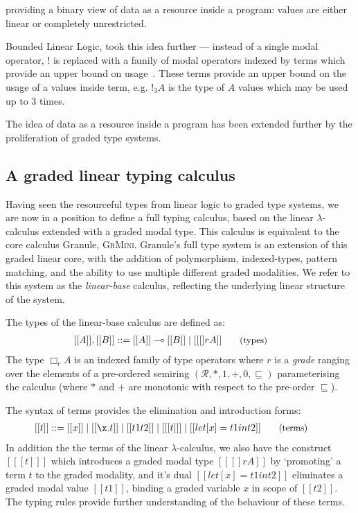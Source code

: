 providing a binary view of data as a
resource inside a program: values are either linear or completely unrestricted.

Bounded Linear Logic, took this idea further --- instead of a single modal
operator, $!$ is replaced with a family of modal operators indexed by terms
which provide an upper bound on usage~\cite{}. These terms provide an upper bound on
the usage of a values inside term, e.g. $!_{3}A$ is the type of $A$ values which
may be used up to 3 times.


The idea of data as a resource inside a program has been extended further by the
proliferation of graded type systems.


\subsection{A graded linear typing calculus}
\label{sec:linear-base}

Having seen the resourceful types from linear logic to graded type systems, we
are now in a position to define a full typing calculus, based on the linear
$\lambda$-calculus extended with a graded modal type. This calculus is
equivalent to the core calculus Granule,
\textsc{GrMini}\cite{}. Granule's full type system is an extension of this
graded linear core, with the addition of polymorphism, indexed-types, pattern
matching, and the ability to use multiple different graded modalities. We refer
to this system as the \textit{linear-base} calculus, reflecting the underlying
linear structure of the system.

The types of the linear-base calculus are defined as:
\begin{align*}
\hspace{-0.9em}[[ A ]] , [[ B ]] & ::=
       [[ A ]] \multimap [[ B ]]
  \mid [[ [] r A ]]
{\small{\tag{types}}}
\end{align*}
The type $\Box_{r} A$ is an indexed family of type operators where $r$ is a
\textit{grade} ranging over the elements of a pre-ordered semiring
$({\mathcal{R}}, {*}, {1}, {+}, {0},
{\sqsubseteq})$ parameterising the calculus (where $\ast$ and $+$
are monotonic with respect to the pre-order $\sqsubseteq$).

The syntax of terms provides the elimination and introduction forms:
\begin{align*}
\hspace{-0.8em} [[ t ]] ::= \;
       & [[ x ]]
  \mid [[ \x . t ]]
  \mid [[ t1 t2 ]]
  \mid [[ [t] ]]
  \mid [[ let [ x ] = t1 in t2 ]]
{\small{\tag{terms}}}
\end{align*}
In addition the the terms of the linear $\lambda$-calculus, we also have the
construct $[[ [t] ]]$ which introduces a graded modal type $[[ [] r A
]]$ by `promoting' a term $t$ to the graded modality, and it's dual $[[ let [x] = t1
in t2 ]]$ eliminates a graded modal value $[[ t1 ]]$, binding a graded variable $x$
in scope of $[[ t2 ]]$. The typing rules provide further understanding of the
behaviour of these terms.

